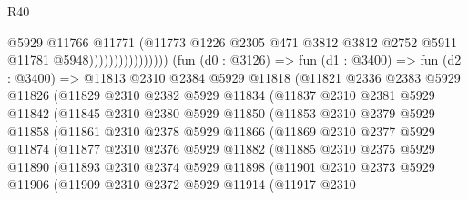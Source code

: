 \begin{lexlean}{R40}
\begin{coremodule}
                                      @5929
                                      @11766
                                      @11771
                                      (@11773
                                        @1226
                                        @2305
                                        @471
                                        @3812
                                        @3812
                                        @2752
                                        @5911
                                        @11781
                                        @5948))))))))))))))))
        (fun (d0 : @3126) =>
        fun (d1 : @3400) =>
        fun (d2 : @3400) =>
        @11813
          @2310
          @2384
          @5929
          @11818
          (@11821
            @2336
            @2383
            @5929
            @11826
            (@11829
              @2310
              @2382
              @5929
              @11834
              (@11837
                @2310
                @2381
                @5929
                @11842
                (@11845
                  @2310
                  @2380
                  @5929
                  @11850
                  (@11853
                    @2310
                    @2379
                    @5929
                    @11858
                    (@11861
                      @2310
                      @2378
                      @5929
                      @11866
                      (@11869
                        @2310
                        @2377
                        @5929
                        @11874
                        (@11877
                          @2310
                          @2376
                          @5929
                          @11882
                          (@11885
                            @2310
                            @2375
                            @5929
                            @11890
                            (@11893
                              @2310
                              @2374
                              @5929
                              @11898
                              (@11901
                                @2310
                                @2373
                                @5929
                                @11906
                                (@11909
                                  @2310
                                  @2372
                                  @5929
                                  @11914
                                  (@11917
                                    @2310

\end{coremodule}
\end{lexlean}
